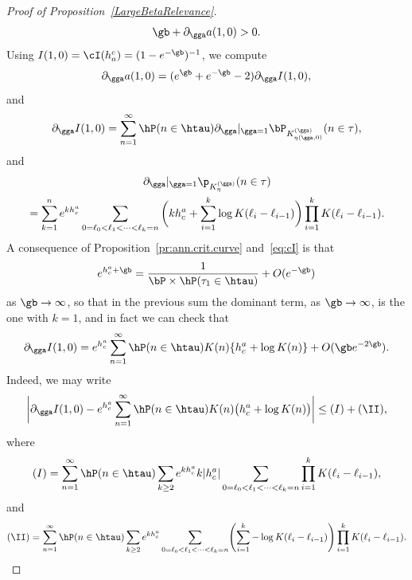 \begin{proof}[Proof of Proposition~\ref{LargeBetaRelevance}]
\begin{equation}\label{DerivativeIneq}
\gb + \partial_\gga a(1,0) > 0.
\end{equation}
Using $I(1,0) =\cI(h_a^c)=(1 - e^{- \gb})^{-1}$, we compute
\begin{equation}
\partial_\gga a(1,0) = (e^\gb + e^{- \gb} - 2) \partial_\gga I(1,0),
\end{equation}
and
\begin{equation}
\partial_\gga I(1,0) = \sum_{n=1}^\infty \hP(n \in \htau) \partial_\gga|_{\gga=1} \bP_{K^{(\gga)}_{\eta(\gga, 0)}}(n \in \tau),
\end{equation}
and
\begin{multline}
\partial_\gga|_{\gga=1} \p_{{K^{(\gga)}_\eta}} (n \in \tau)\\
 = \sum_{k=1}^n e^{k h_c^a} \sum_{0 = \ell_0 < \ell_1 < \cdots < \ell_k = n} \bigg(k h_c^a + \sum_{i=1}^k \log K(\ell_i - \ell_{i-1}) \bigg) \prod_{i=1}^k K(\ell_i - \ell_{i-1}).
\end{multline}
A consequence of Proposition~\ref{pr:ann.crit.curve} and~\eqref{eq:cI} is that
\begin{equation}\label{hcAsymptotics}
e^{h_c^a + \gb} = \frac{1}{\bP \times \hP (\tau_1 \in \htau)} + O(e^{- \gb})
\end{equation}
as $\gb \to \infty$, so that in the previous sum the dominant term, as $\gb \to \infty$, is the one with $k = 1$, and in fact we can check that
\begin{equation}\label{eq:partialIgamma_aux}
\partial_\gga I(1,0) = e^{h_c^a} \sum_{n=1}^\infty \hP(n \in \htau) K(n) \{h_c^a + \log K(n)\} + O(\gb e^{- 2 \gb}).
\end{equation}
Indeed, we may write
\begin{equation}
\bigg| \partial_\gga I(1,0) - e^{h_c^a} \sum_{n=1}^\infty \hP(n \in \htau) K(n) \big(h_c^a + \log K(n) \big) \bigg| \leq (I) + (\II),
\end{equation}
where
\begin{equation}
(I) = \sum_{n=1}^\infty \hP(n \in \htau) \sum_{k\geq2} e^{k h_c^a} k |h_c^a| \sum_{0 = \ell_0 < \ell_1 < \cdots < \ell_k = n} \prod_{i=1}^k K(\ell_i - \ell_{i-1}),
\end{equation}
and
\begin{equation}
(\II) = \sum_{n=1}^\infty \hP(n \in \htau) \sum_{k\geq2} e^{k h_c^a} \sum_{0 = \ell_0 < \ell_1 < \cdots < \ell_k = n}\! \left(\sum_{i=1}^k - \log K(\ell_i - \ell_{i-1}) \right) \prod_{i=1}^k K(\ell_i - \ell_{i-1}).
\end{equation}

\end{proof}
